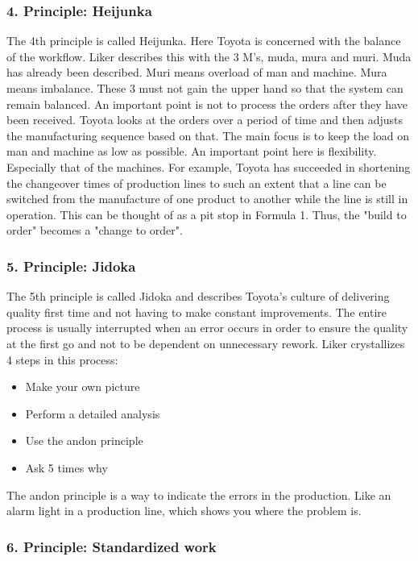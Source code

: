 \documentclass[a4paper,12pt]{scrartcl}
\begin{document}
\subsubsection{4. Principle: Heijunka}

The 4th principle is called Heijunka. Here Toyota is concerned with the balance of the workflow. Liker describes this with the 3 M's, muda, mura and muri. Muda has already been described. Muri means overload of man and machine. Mura means imbalance. These 3 must not gain the upper hand so that the system can remain balanced. An important point is not to process the orders after they have been received. Toyota looks at the orders over a period of time and then adjusts the manufacturing sequence based on that. The main focus is to keep the load on man and machine as low as possible. An important point here is flexibility. Especially that of the machines. For example, Toyota has succeeded in shortening the changeover times of production lines to such an extent that a line can be switched from the manufacture of one product to another while the line is still in operation. This can be thought of as a pit stop in Formula 1. Thus, the "build to order" becomes a "change to order".

\subsubsection{5. Principle: Jidoka}

The 5th principle is called Jidoka and describes Toyota's culture of delivering quality first time and not having to make constant improvements. The entire process is usually interrupted when an error occurs in order to ensure the quality at the first go and not to be dependent on unnecessary rework. Liker crystallizes 4 steps in this process:

\begin{itemize}
    \item Make your own picture
    \item Perform a detailed analysis
    \item Use the andon principle 
    \item Ask 5 times why
\end{itemize}

The andon principle is a way to indicate the errors in the production. Like an alarm light in a production line, which shows you where the problem is.

\subsubsection{6. Principle: Standardized work}
\end{document}
